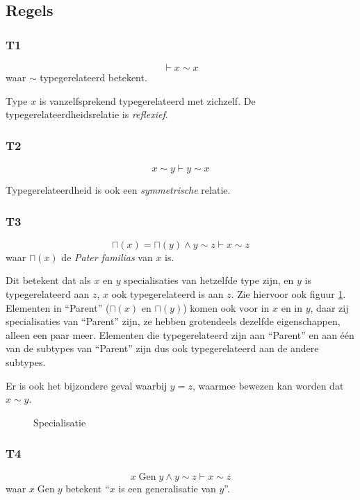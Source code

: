 \documentclass[10pt]{article}
\begin{document}
\subsection{Regels}
\label{sse:regels}
\subsubsection{T1}

\[ 
  \vdash x \sim x
\] waar $\sim$ typegerelateerd betekent.

Type $x$ is vanzelfsprekend typegerelateerd met zichzelf. De typegerelateerdheidsrelatie
is \emph{reflexief}.

\subsubsection{T2}
\[ 
  x \sim y \vdash y \sim x
\]

Typegerelateerdheid is ook een \emph{symmetrische} relatie.

\subsubsection{T3}
\label{s2e:t3}
\[
  \sqcap (x) = \sqcap (y) \wedge y \sim z \vdash x \sim z
\] waar $\sqcap (x)$ de \emph{Pater familias} van $x$ is.

Dit betekent dat als $x$ en $y$ specialisaties van hetzelfde
type zijn, en $y$ is typegerelateerd aan $z$, $x$ ook typegerelateerd is
aan $z$. Zie hiervoor ook figuur \ref{fig:specialisatie}. Elementen in
``Parent'' ($\sqcap(x)$ en $\sqcap(y)$) komen ook voor in $x$ en in $y$, daar
zij specialisaties van ``Parent'' zijn, ze hebben grotendeels dezelfde
eigenschappen, alleen een paar meer. Elementen die typegerelateerd zijn aan
``Parent'' en aan \'e\'en van de subtypes van ``Parent'' zijn dus ook
typegerelateerd aan de andere subtypes.

Er is ook het bijzondere geval waarbij $y=z$, waarmee bewezen kan worden
dat $x \sim y$.

\begin{figure}
  \centering
  \caption{Specialisatie}
  \label{fig:specialisatie}
\end{figure}


\subsubsection{T4}
\[
  x \operatorname{Gen} y \wedge y \sim z \vdash x \sim z
\] waar $x \operatorname{Gen} y$ betekent ``$x$ is een generalisatie van $y$''.
\end{document}
